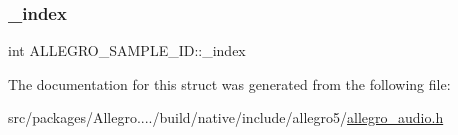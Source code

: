 \subsubsection{\texorpdfstring{\+\_\+index}{\_index}}
{\footnotesize\ttfamily int A\+L\+L\+E\+G\+R\+O\+\_\+\+S\+A\+M\+P\+L\+E\+\_\+\+I\+D\+::\+\_\+index}



The documentation for this struct was generated from the following file\+:\begin{DoxyCompactItemize}
\item 
src/packages/\+Allegro..../build/native/include/allegro5/\hyperlink{allegro__audio_8h}{allegro\+\_\+audio.\+h}\end{DoxyCompactItemize}
